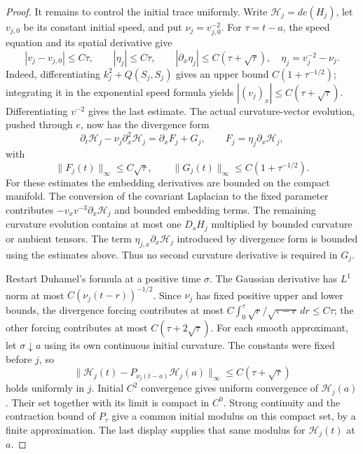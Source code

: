 \begin{proof}
It remains to control the initial trace uniformly.
Write $\mathcal H_j=de(H_j)$, let $v_{j,0}$ be its constant
initial speed, and put $\nu_j=v_{j,0}^{-2}$.
For $\tau=t-a$, the speed equation and its spatial derivative give
\[
 |v_j-v_{j,0}|\le C\tau,\qquad
 |\eta_j|\le C\tau,\qquad
 |\partial_x\eta_j|\le C(\tau+\sqrt{\tau}),
 \quad \eta_j=v_j^{-2}-\nu_j.
\]
Indeed, differentiating $k_j^2+Q(S_j,S_j)$ gives an
upper bound $C(1+\tau^{-1/2})$; integrating it in the
exponential speed formula yields
$|(v_j)_x|\le C(\tau+\sqrt{\tau})$.  Differentiating $v^{-2}$
gives the last estimate.
The actual curvature-vector evolution, pushed through $e$,
now has the divergence form
\[
 \partial_t\mathcal H_j-\nu_j\partial_x^2\mathcal H_j
       =\partial_x F_j+G_j,\qquad
 F_j=\eta_j\partial_x\mathcal H_j,
\]
with
\[
 \|F_j(t)\|_\infty\le C\sqrt{\tau},\qquad
 \|G_j(t)\|_\infty\le C(1+\tau^{-1/2}).
\]
For these estimates the embedding derivatives are bounded on
the compact manifold.  The conversion of the covariant
Laplacian to the fixed parameter contributes
$-v_xv^{-3}\partial_x\mathcal H_j$ and bounded embedding
terms.  The remaining curvature evolution contains at most
one $D_sH_j$ multiplied by bounded curvature or ambient tensors.
The term $\eta_{j,x}\partial_x\mathcal H_j$ introduced by
divergence form is bounded using the estimates above.
Thus no second curvature derivative is required in $G_j$.

Restart Duhamel's formula at a positive time $\sigma$.
The Gaussian derivative has $L^1$ norm at most
$C(\nu_j(t-r))^{-1/2}$.  Since $\nu_j$ has fixed positive
upper and lower bounds, the divergence forcing contributes
at most
$C\int_0^\tau\sqrt r/\sqrt{\tau-r}\,dr\le C\tau$;
the other forcing contributes at most $C(\tau+2\sqrt\tau)$.
For each smooth approximant, let $\sigma\downarrow a$
using its own continuous initial curvature.  The constants
were fixed before $j$, so
\[
 \|\mathcal H_j(t)-P_{\nu_j(t-a)}\mathcal H_j(a)\|_\infty
                        \le C(\tau+\sqrt\tau)
\]
holds uniformly in $j$.  Initial $C^2$ convergence gives
uniform convergence of $\mathcal H_j(a)$.  Their set together
with its limit is compact in $C^0$.  Strong continuity and
the contraction bound of $P_\tau$ give a common initial
modulus on this compact set, by a finite approximation.
The last display supplies that same modulus for
$\mathcal H_j(t)$ at $a$.


\end{proof}

